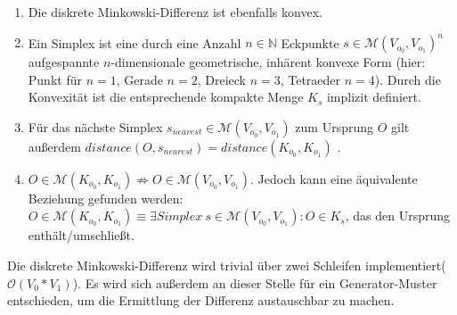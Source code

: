 \begin{enumerate}
		\item Die diskrete Minkowski-Differenz ist ebenfalls konvex.	
		\item Ein Simplex ist eine durch eine Anzahl $n\in\mathbb{N}$ Eckpunkte $s\in\mathcal{M}(V_{o_0}, V_{o_1})^n$ aufgespannte $n$-dimensionale geometrische, inhärent konvexe Form (hier: Punkt für $n=1$, Gerade $n=2$, Dreieck $n=3$, Tetraeder $n=4$). Durch die Konvexität ist die entsprechende kompakte Menge $K_s$ implizit definiert.
		\item Für das nächste Simplex $s_{nearest} \in \mathcal{M}(V_{o_0}, V_{o_1})$ zum Ursprung $O$ gilt außerdem $distance(O, s_{nearest}) = distance(K_{o_0}, K_{o_1})$ \cite[p. 195]{gjk}. 
		\item $O \in \mathcal{M}(K_{o_0}, K_{o_1}) \nRightarrow O \in \mathcal{M}(V_{o_0}, V_{o_1})$. Jedoch kann eine äquivalente Beziehung gefunden werden: $O \in \mathcal{M}(K_{o_0}, K_{o_1}) \equiv \exists Simplex~s \in \mathcal{M}(V_{o_0}, V_{o_1}) : O \in K_s$, das den Ursprung enthält/umschließt.

\end{enumerate}
Die diskrete Minkowski-Differenz wird trivial über zwei Schleifen implementiert($\mathcal{O}(V_0 * V_1)$). Es wird sich außerdem an dieser Stelle für ein Generator-Muster entschieden, um die Ermittlung der Differenz austauschbar zu machen.

